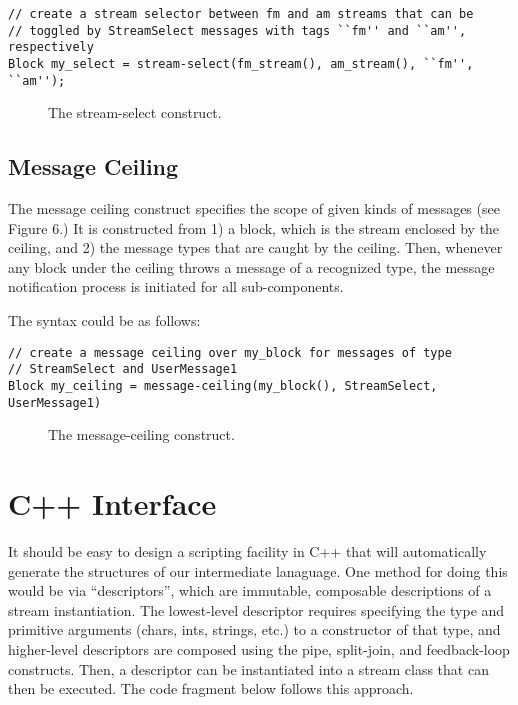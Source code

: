 \begin{verbatim}
// create a stream selector between fm and am streams that can be 
// toggled by StreamSelect messages with tags ``fm'' and ``am'', respectively
Block my_select = stream-select(fm_stream(), am_stream(), ``fm'', ``am'');
\end{verbatim}

\begin{figure}[t]
\centerline{}
\vspace{-24pt}
\caption{\protect\small The stream-select construct.}
\end{figure}

\subsection{Message Ceiling}

The message ceiling construct specifies the scope of given kinds of
messages (see Figure 6.)  It is constructed from 1) a block, which is
the stream enclosed by the ceiling, and 2) the message types that are
caught by the ceiling.  Then, whenever any block under the ceiling
throws a message of a recognized type, the message notification process
is initiated for all sub-components.

The syntax could be as follows:

\begin{verbatim}
// create a message ceiling over my_block for messages of type
// StreamSelect and UserMessage1
Block my_ceiling = message-ceiling(my_block(), StreamSelect, UserMessage1)
\end{verbatim}

\begin{figure}[t]
\centerline{}
\vspace{-24pt}
\caption{\protect\small The message-ceiling construct.}
\end{figure}

\section{C++ Interface}

It should be easy to design a scripting facility in C++ that will
automatically generate the structures of our intermediate lanaguage.
One method for doing this would be via ``descriptors'', which are
immutable, composable descriptions of a stream instantiation.  The
lowest-level descriptor requires specifying the type and primitive
arguments (chars, ints, strings, etc.) to a constructor of that type,
and higher-level descriptors are composed using the pipe, split-join,
and feedback-loop constructs.  Then, a descriptor can be instantiated
into a stream class that can then be executed.  The code fragment below
follows this approach.

